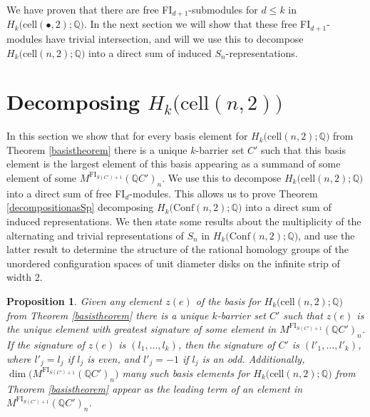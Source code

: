 \documentclass[12py]{amsart}%
\newtheorem{prop}[thm]{Proposition}
\theoremstyle{definition}\newtheorem{definition}[thm]{Definition}
\theoremstyle{definition}
\newcommand{\Q}{\ensuremath{\mathbb{Q}}}
\begin{document}
We have proven that there are free FI$_{d+1}$-submodules for $d\le k$ in $H_{k}\big(\text{cell}(\bullet,2);\Q\big)$. In the next section we will show that these free FI$_{d+1}$-modules have trivial intersection, and will we use this to decompose $H_{k}\big(\text{cell}(n,2);\Q\big)$ into a direct sum of induced $S_{n}$-representations.

\section{Decomposing $H_{k}\big(\text{cell}(n,2)\big)$}\label{putting it all together}

In this section we show that for every basis element for $H_{k}\big(\text{cell}(n,2);\Q\big)$ from Theorem \ref{basistheorem} there is a unique $k$-barrier set $C'$ such that this basis element is the largest element of this basis appearing as a summand of some element of some $M^{\text{FI}_{S(C')+1}}(\Q C')_{n}$. We use this to decompose $H_{k}\big(\text{cell}(n,2);\Q\big)$ into a direct sum of free FI$_{d}$-modules. This allows us to prove Theorem \ref{decompositionasSp} decomposing $H_{k}\big(\text{Conf}(n,2);\Q\big)$ into a direct sum of induced representations. We then state some results about the multiplicity of the alternating and trivial representations of $S_{n}$ in $H_{k}\big(\text{Conf}(n,2);\Q\big)$, and use the latter result to determine the structure of the rational homology groups of the unordered configuration spaces of unit diameter disks on the infinite strip of width $2$.

\begin{prop}\label{uniquekbarrier}
Given any element $z(e)$ of the basis for $H_{k}\big(\text{cell}(n,2);\Q\big)$ from Theorem \ref{basistheorem} there is a unique $k$-barrier set $C'$ such that $z(e)$ is the unique element with greatest signature of some element in $M^{\text{FI}_{S(C')+1}}(\Q C')_{n}$. If the signature of $z(e)$ is $(l_{1},\dots, l_{k})$, then the signature of $C'$ is $(l'_{1},\dots, l'_{k})$, where $l'_{j}=l_{j}$ if $l_{j}$ is even, and $l'_{j}=-1$ if $l_{j}$ is an odd. Additionally, $\dim\big(M^{\text{FI}_{S(C')+1}}(\Q C')_{n}\big)$ many such basis elements for $H_{k}\big(\text{cell}(n,2);\Q\big)$ from Theorem \ref{basistheorem} appear as the leading term of an element in $M^{\text{FI}_{S(C')+1}}(\Q C')_{n}$.
\end{prop}
\end{document}
